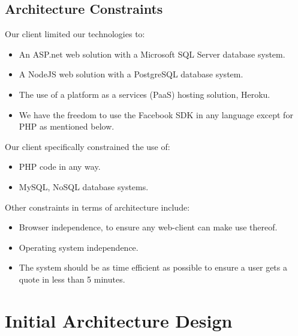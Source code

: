 \documentclass{article}
\begin{document}
	\subsection{Architecture Constraints}
	Our client limited our technologies to:
	\begin{itemize}
		\item An ASP.net web solution with a Microsoft SQL Server database system.
		\item A NodeJS web solution with a PostgreSQL database system.
		\item The use of a platform as a services (PaaS) hosting solution, Heroku.
		\item We have the freedom to use the Facebook SDK in any language except for PHP as mentioned below.
	\end{itemize}
	Our client specifically constrained the use of:
		\begin{itemize}
		\item PHP code in any way.
		\item MySQL, NoSQL database systems.
		\end{itemize}	
	Other constraints in terms of architecture include:
	\begin{itemize}
		\item Browser independence, to ensure any web-client can make use thereof.
		\item Operating system independence.
		\item The system should be as time efficient as possible to ensure a user gets a quote in less than 5 minutes.
		\end{itemize}
	
	
	\section{Initial Architecture Design}


	


	
\end{document}
